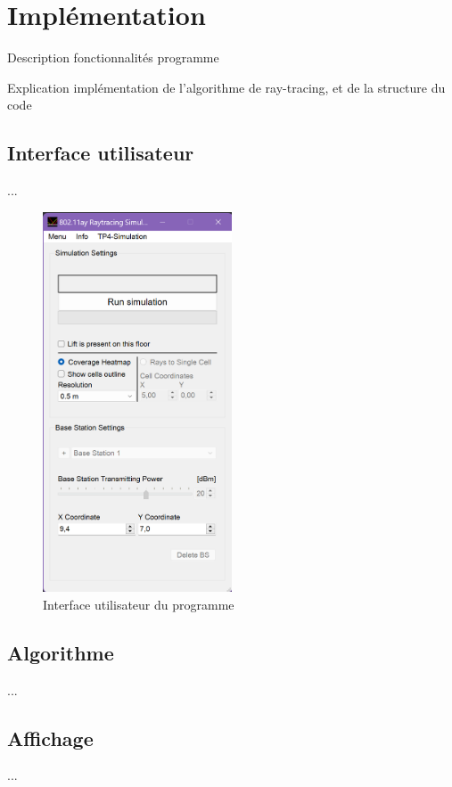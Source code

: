\chapter{Implémentation}
\label{chaper-2}

Description fonctionnalités programme

Explication implémentation de l'algorithme de ray-tracing, et de la structure du code


\section{Interface utilisateur}
...

\begin{figure}[H]
    \centering
    \includegraphics[width=0.5\textwidth]{latex/images/interface.png}
    \caption{Interface utilisateur du programme}
    \label{fig:interface}
\end{figure}

\section{Algorithme}
...

\section{Affichage}
...

